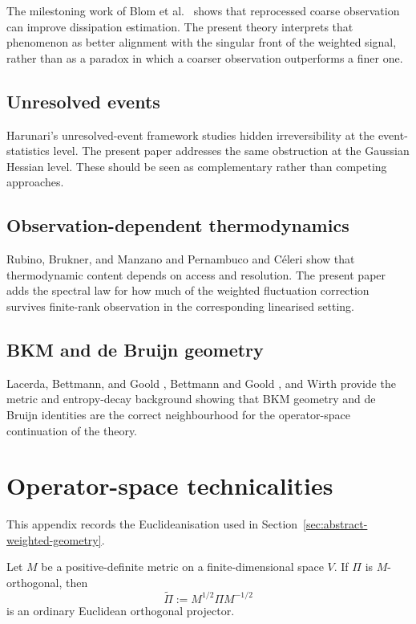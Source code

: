 \documentclass[11pt,a4paper]{article}
\numberwithin{equation}{section}
\theoremstyle{thmcompact}
\theoremstyle{remark}
\begin{document}
The milestoning work of Blom et al.\ \cite{BlomSongVougaGodecMakarov2025} shows that reprocessed coarse observation can improve dissipation estimation. The present theory interprets that phenomenon as better alignment with the singular front of the weighted signal, rather than as a paradox in which a coarser observation outperforms a finer one.

\subsection{Unresolved events}

Harunari's unresolved-event framework \cite{Harunari2024} studies hidden irreversibility at the event-statistics level. The present paper addresses the same obstruction at the Gaussian Hessian level. These should be seen as complementary rather than competing approaches.

\subsection{Observation-dependent thermodynamics}

Rubino, Brukner, and Manzano \cite{RubinoBruknerManzano2025} and Pernambuco and Céleri \cite{PernambucoCeleri2026} show that thermodynamic content depends on access and resolution. The present paper adds the spectral law for how much of the weighted fluctuation correction survives finite-rank observation in the corresponding linearised setting.

\subsection{BKM and de Bruijn geometry}

Lacerda, Bettmann, and Goold \cite{LacerdaBettmannGoold2025}, Bettmann and Goold \cite{BettmannGoold2025}, and Wirth \cite{Wirth2025} provide the metric and entropy-decay background showing that BKM geometry and de Bruijn identities are the correct neighbourhood for the operator-space continuation of the theory.

\section{Operator-space technicalities}
\label{app:operator_space_technicalities}

This appendix records the Euclideanisation used in Section~\ref{sec:abstract-weighted-geometry}.

Let \(M\) be a positive-definite metric on a finite-dimensional space \(V\). If \(\Pi\) is \(M\)-orthogonal, then
\begin{equation}
\widetilde\Pi:=M^{1/2}\Pi M^{-1/2}
\end{equation}
is an ordinary Euclidean orthogonal projector.
\end{document}

